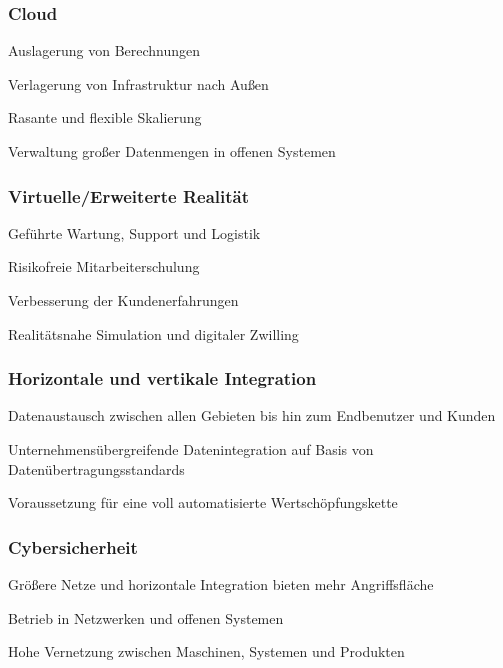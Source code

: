\subsubsection*{Cloud}
\begin{compactenum}[•]
    \item Auslagerung von Berechnungen
    \item Verlagerung von Infrastruktur nach Außen
    \item Rasante und flexible Skalierung
    \item Verwaltung großer Datenmengen in offenen Systemen
\end{compactenum}

\subsubsection*{Virtuelle/Erweiterte Realität}
\begin{compactenum}[•]
    \item Geführte Wartung, Support und Logistik
    \item Risikofreie Mitarbeiterschulung
    \item Verbesserung der Kundenerfahrungen
    \item Realitätsnahe Simulation und digitaler Zwilling
\end{compactenum}

\subsubsection*{Horizontale und vertikale Integration}
\begin{compactenum}[•]
    \item Datenaustausch zwischen allen Gebieten bis hin zum Endbenutzer und Kunden
    \item Unternehmensübergreifende Datenintegration auf Basis von Datenübertragungsstandards
    \item Voraussetzung für eine voll automatisierte Wertschöpfungskette
\end{compactenum}

\subsubsection*{Cybersicherheit}
\begin{compactenum}[•]
    \item Größere Netze und horizontale Integration bieten mehr Angriffsfläche
    \item Betrieb in Netzwerken und offenen Systemen
    \item Hohe Vernetzung zwischen Maschinen, Systemen und Produkten
\end{compactenum}

